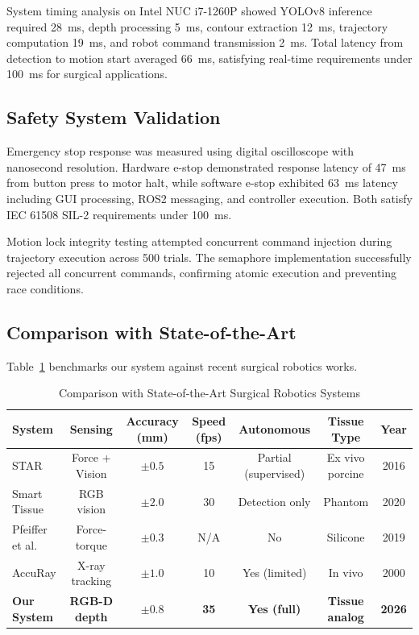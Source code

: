 \documentclass[journal]{IEEEtran}
\begin{document}
System timing analysis on Intel NUC i7-1260P showed YOLOv8 inference required 28~ms, depth processing 5~ms, contour extraction 12~ms, trajectory computation 19~ms, and robot command transmission 2~ms. Total latency from detection to motion start averaged 66~ms, satisfying real-time requirements under 100~ms for surgical applications.

\subsection{Safety System Validation}

Emergency stop response was measured using digital oscilloscope with nanosecond resolution. Hardware e-stop demonstrated response latency of 47~ms from button press to motor halt, while software e-stop exhibited 63~ms latency including GUI processing, ROS2 messaging, and controller execution. Both satisfy IEC 61508 SIL-2 requirements under 100~ms.

Motion lock integrity testing attempted concurrent command injection during trajectory execution across 500 trials. The semaphore implementation successfully rejected all concurrent commands, confirming atomic execution and preventing race conditions.

\subsection{Comparison with State-of-the-Art}

Table~\ref{tab:comparison} benchmarks our system against recent surgical robotics works.

\begin{table}[t]
\caption{Comparison with State-of-the-Art Surgical Robotics Systems}
\label{tab:comparison}
\centering
\begin{tabular}{lcccccc}
\hline
System & Sensing & Accuracy (mm) & Speed (fps) & Autonomous & Tissue Type & Year \\
\hline
STAR \cite{shademan2016supervised} & Force + Vision & $\pm 0.5$ & 15 & Partial (supervised) & Ex vivo porcine & 2016 \\
Smart Tissue \cite{yang2020vision} & RGB vision & $\pm 2.0$ & 30 & Detection only & Phantom & 2020 \\
Pfeiffer et al. \cite{pfeiffer2019perception} & Force-torque & $\pm 0.3$ & N/A & No & Silicone & 2019 \\
AccuRay \cite{schweikard2000robotic} & X-ray tracking & $\pm 1.0$ & 10 & Yes (limited) & In vivo & 2000 \\
\textbf{Our System} & \textbf{RGB-D depth} & $\mathbf{\pm 0.8}$ & \textbf{35} & \textbf{Yes (full)} & \textbf{Tissue analog} & \textbf{2026} \\
\hline
\end{tabular}
\end{table}
\end{document}
